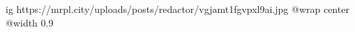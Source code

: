  
 
 
 
 

\ifcmt
  ig https://mrpl.city/uploads/posts/redactor/vgjamt1fgvpxl9ai.jpg
  @wrap center
  @width 0.9
\fi
